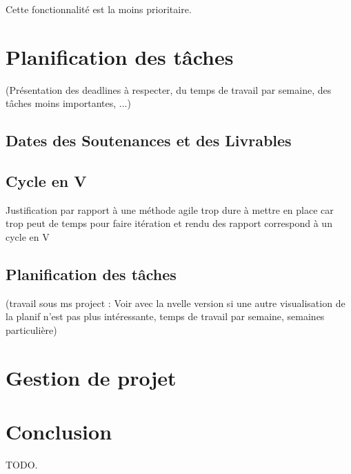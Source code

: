 \documentclass[a4paper]{article}
\begin{document}
	Cette fonctionnalité est la moins prioritaire.
	
\section{Planification des tâches}
(Présentation des deadlines à respecter, du temps de travail par semaine, des tâches moins importantes, ...)
	\subsection{Dates des Soutenances et des Livrables}
	\subsection{Cycle en V}
	Justification par rapport à une méthode agile trop dure à mettre en place car trop peut de temps pour faire itération et rendu des rapport correspond à un cycle en V
	\subsection{Planification des tâches}
	(travail sous ms project : Voir avec la nvelle version si une autre visualisation de la planif n'est pas plus intéressante, temps de travail par semaine, semaines particulière)

\section{Gestion de projet}

\newpage
{}
{}
\section*{Conclusion}

TODO.
\end{document}
